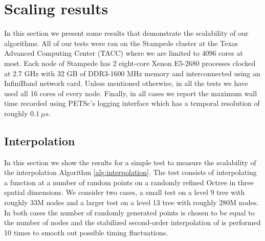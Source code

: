 \section{Scaling results} \label{sec:scaling}
In this section we present some results that demonstrate the scalability of our algorithms. All of our tests were ran on the Stampede cluster at the Texas Advanced Computing Center (TACC) where we are limited to $4096$ cores at most. Each node of Stampede has 2 eight-core Xenon E5-2680 processes clocked at 2.7 GHz with 32 GB of DDR3-1600 MHz memory and interconnected using an InfiniBand network card. Unless mentioned otherwise, in all the tests we have used all 16 cores of every node. Finally, in all cases we report the maximum wall time recorded using PETSc's logging interface which has a temporal resolution of roughly $0.1 \: \mu s$.

\subsection{Interpolation}
In this section we show the results for a simple test to measure the scalability of the interpolation Algorithm \ref{alg:interpolation}. The test consists of interpolating a function at a number of random points on a randomly refined Octree in three spatial dimensions. We consider two cases, a small test on a level 9 tree with roughly 33M nodes and a larger test on a level 13 tree with roughly 280M nodes. In both cases the number of randomly generated points is chosen to be equal to the number of nodes and the stabilized second-order interpolation of \cite{Min;Gibou:07:A-second-order-accur} is performed 10 times to smooth out possible timing fluctuations.

